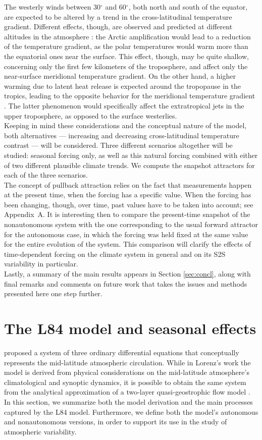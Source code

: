 \documentclass[%
 aip, cha,
 amsmath,amssymb,
 reprint,%
author-year,%
]{revtex4-1}
\newcommand{\0}{\mathbf 0}
\begin{document}
The westerly winds between 30$^{\circ}$ and 60$^{\circ}$, both north and south of the equator, are expected to be altered by a trend in the cross-latitudinal temperature gradient. Different effects, though, are observed and predicted at different altitudes in the atmosphere \citep{jetstream}: the Arctic amplification would lead to a reduction of the temperature gradient, as the polar temperatures would warm more than the equatorial ones near the surface. This effect, though, may be quite shallow, concerning only the first few kilometers of the troposphere, and affect only the near-surface meridional temperature gradient. On the other hand, a higher warming due to latent heat release is expected around the tropopause in the tropics, leading to the opposite behavior for the meridional temperature gradient \citep{jetstream}. The latter phenomenon would specifically affect the extratropical jets in the upper troposphere, as opposed to the surface westerlies. \\
Keeping in mind these considerations and the conceptual nature of the model, both alternatives ---  increasing and decreasing cross-latitudinal temperature contrast --- will be considered. Three  different scenarios altogether will be studied: seasonal forcing only, as well as this natural forcing combined with either of two different plausible climate trends. We compute the snapshot attractors for each of the three scenarios. \\
The concept of pullback attraction relies on the fact that measurements happen at the present time, when the forcing has a specific value. When the forcing has been changing, though, over time, past values have to be taken into account; see Appendix~A. It is interesting then to compare the present-time snapshot of the nonautonomous system with the one corresponding to the usual forward attractor for the autonomous case, in which the forcing was held fixed at the same value for the entire evolution of the system. This comparison will clarify the effects of time-dependent forcing  on the climate system in general and on its S2S variability in particular. \\ 
Lastly, a summary of the main results appears in Section \ref{sec:concl}, along with final remarks and comments on future work that takes the issues and methods presented here one step further.

\section{The L84 model and seasonal effects}
\label{sec:L84}
\cite{lorenz84} proposed a system of three ordinary differential equations that conceptually represents the mid-latitude atmospheric circulation.
While in Lorenz's work the model is derived from physical considerations on the  mid-latitude atmosphere's climatological and synoptic dynamics, it is possible to obtain the same system from the analytical approximation of a two-layer quasi-geostrophic flow model \citep{vanveen2003}.
In this section, we summarize both the model derivation and the main processes captured by the L84 model. Furthermore, we define both the model's autonomous and nonautonomous versions, in order to support its use in the study of atmospheric variability. 
\end{document}
